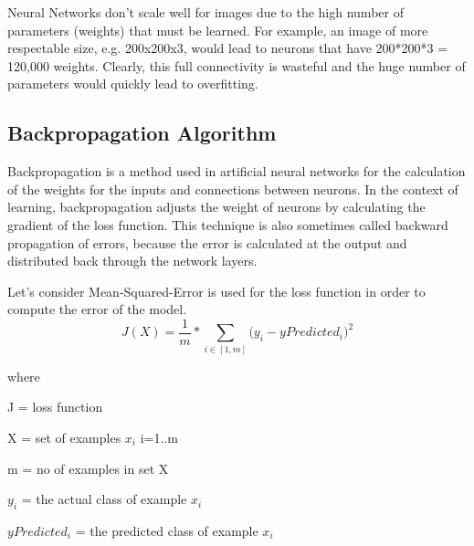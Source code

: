 \documentclass[a4paper,10pt]{article}
\begin{document}
\quad Neural Networks don't scale well for images due to the high number of parameters (weights) that must be learned. For example, an image of more respectable size, e.g. 200x200x3, would lead to neurons that have 200*200*3 = 120,000 weights. Clearly, this full connectivity is wasteful and the huge number of parameters would quickly lead to overfitting.

\vspace{5mm} %

 \subsection{Backpropagation Algorithm}
 
 \quad Backpropagation is a method used in artificial neural networks for the calculation of the weights for the inputs and connections between neurons. In the context of learning, backpropagation adjusts the weight of neurons by calculating the gradient of the loss function. This technique is also sometimes called backward propagation of errors, because the error is calculated at the output and distributed back through the network layers.
 
 \quad Let's consider  Mean-Squared-Error is used for the loss function in order to compute the error of the model.
  $$ J(X) = \frac{1}{m} * \sum_{i \in [1,m]}  {(y_{i} - yPredicted_ {i}})^2  $$
  
  where 
  
  \quad J = loss function 
  
  \quad X = set of examples  $x_{i}$ i=1..m
  
  \quad m = no of examples in set X
  
  \quad $y_{i}$ = the actual class of example $x_{i}$ 
  
  \quad $yPredicted_{i}$ = the predicted class of example $x_{i}$
  
\end{document}
